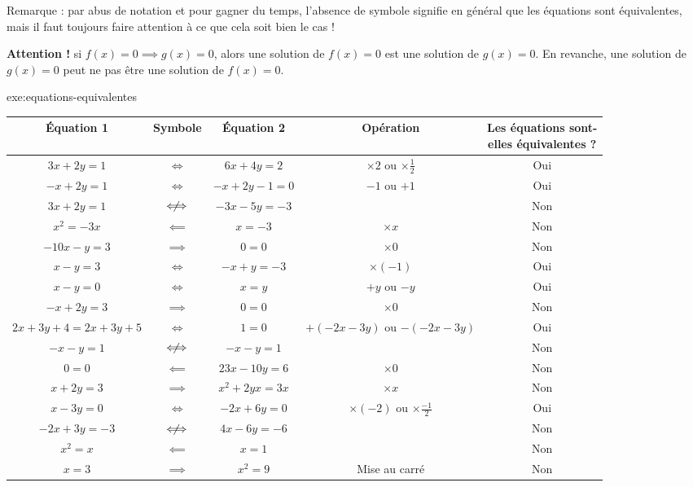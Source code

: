 {	{Remarque : par abus de notation et pour gagner du temps, l'absence de symbole signifie en général que les équations sont équivalentes, mais il faut toujours faire attention à ce que cela soit bien le cas !}
	
	\textbf{Attention !} si $f(x) = 0 \implies g(x) = 0$, alors une solution de $f(x) = 0$ est une solution de $g(x) = 0$.
	En revanche, une solution de $g(x) = 0$ peut ne pas être une solution de $f(x) = 0$.
	
}{exe:equations-equivalentes}{
	\begin{center}
	\begin{tabular}{ccc|c|c}
		Équation 1 & Symbole & Équation 2 & Opération & \thead{Les équations sont-\\ elles équivalentes ?} \\ \hline
		$3x + 2y = 1$ & {$\iff$} & $6x  + 4y = 2$ & $\times2$ ou $\times\frac12$ & {Oui} \\ \hline
		$-x + 2y = 1$ & {$\iff$} & $-x + 2y - 1 = 0$ & {$-1$ ou $+1$} & {Oui} \\ \hline
		$3x + 2y = 1$ & {$\centernot\iff$} & $-3x - 5y = -3$ & & {Non} \\ \hline
		$x^2 = -3x$ & {$\impliedby$} & $x = -3$ &$\times x$ & {Non} \\ \hline
		$-10x - y = 3$ & {$\implies$} & $0=0$ & {$\times0$} & {Non} \\ \hline
		$x-y= 3$ & {$\iff$} & $-x + y = -3$ & {$\times(-1)$} & {Oui} \\ \hline
		$x -y = 0$ &{$\iff$} & $x=y$ & {$+y$ ou $-y$} & {Oui} \\ \hline
		$-x + 2y = 3$ & {$\implies$} & $0=0$ & {$\times0$} & {Non} \\ \hline
		$2x + 3y + 4 = 2x + 3y + 5$ & {$\iff$} & $1=0$ & $+(-2x-3y)$ ou $-(-2x-3y)$ & {Oui} \\ \hline
		$-x - y = 1$ & {$\centernot\iff$} & $-x - y = 1$ & & {Non} \\ \hline
		$0=0$ & {$\impliedby$} & $23x - 10y = 6$ & $\times0$ & {Non} \\ \hline
		$x + 2y = 3$ & {$\implies$} & $x^2 + 2yx = 3x$ & {$\times x$} & {Non} \\ \hline
		$x-3y  =0$ & {$\iff$} & $-2x+6y = 0$ & {$\times(-2)$ ou $\times\frac{-1}2$} & {Oui} \\ \hline
		$-2x + 3y = -3$ & {$\centernot\iff$} & $4x - 6y = -6$ & & {Non} \\ \hline
		$x^2 = x$ & {$\impliedby$} & $x = 1$ & & {Non} \\ \hline
		$x = 3$ & {$\implies$} & $x^2 = 9$ & {Mise au carré} & {Non} \\ \hline
	\end{tabular}
	\end{center}
}


